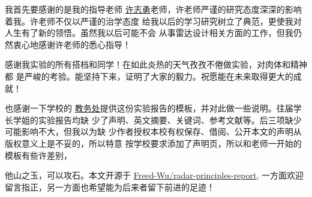 \documentclass[../main]{subfiles}
\begin{document}
\begin{acknowledgement}

  我首先要感谢的是我的指导老师
  \href{http://gsmis.njust.edu.cn/Open/TutorInfo.aspx?dsbh=AXn0dhWNfYeOvvNLjU77xw==&yxsh=9T4MAi3dYTw=}{%
  许志勇}老师，许老师严谨的研究态度深深的影响着我。许老师不仅以严谨的治学态度
  给我以后的学习研究树立了典范，更使我对人生有了新的领悟。虽然我以后可能不会
  从事雷达设计相关方面的工作，但我仍然衷心地感谢许老师的悉心指导！

  感谢我实验的所有搭档和同学！在如此炎热的天气孜孜不倦做实验，对肉体和精神都
  是严峻的考验。能坚持下来，证明了大家的毅力。祝愿能在未来取得更大的成就！

  也感谢一下学校的
  \href{http://bysj.njust.edu.cn/shownews.aspx?newsno=vfRf1W708GGB4ZkVqKVqJw....}{%
  教务处}提供这份实验报告的模板，并对此做一些说明。往届学长学姐的实验报告均缺
  少了声明、英文摘要、关键词、参考文献等。后三项缺少可能影响不大，但我以为缺
  少作者授权本校有权保存、借阅、公开本文的声明从版权意义上是不妥的，所以特意
  按学校要求添加了声明页，所以和老师一开始的模板有些许差别，

  他山之玉，可以攻石。本文开源于
  \href{https://github.com/Freed-Wu/radar-principles-report}{Freed-Wu/radar-principles-report},
  一方面欢迎留言指正，另一方面也希望能为后来者留下前进的足迹！
\end{acknowledgement}
\end{document}
